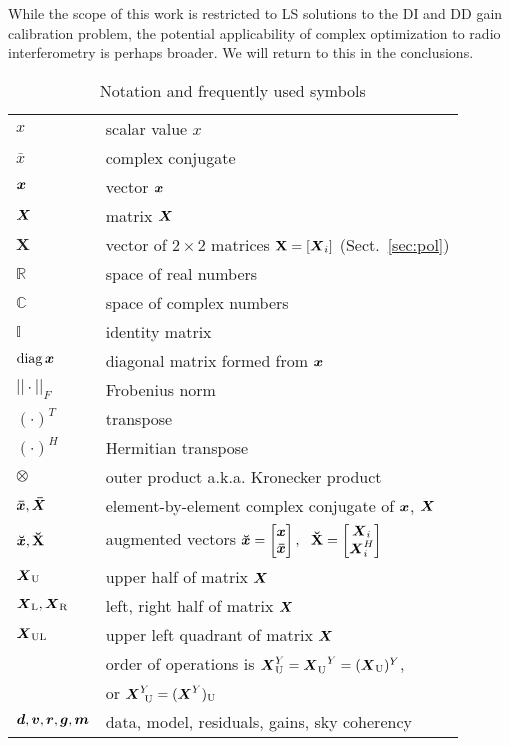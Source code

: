 \documentclass[useAMS,usenatbib]{mn2e}
\makeatletter
\newcommand{\COMPLEX}{\mathbb{C}}
\newcommand{\REAL}{\mathbb{R}}
\newcommand{\II}{\mathbb{I}}
\newcommand{\Matrix}[2]{\left [ \begin{array}{@{}#1@{}}#2\end{array} \right ]}
\newcommand{\AUGx}[1]{\mathbf{\breve{#1}}}
\newcommand{\AUG}[1]{\bmath{\breve{#1}}}
\newcommand{\TOP}{\mathrm{U}}%
\newcommand{\LEFT}{\mathrm{L}}
\newcommand{\RIGHT}{\mathrm{R}}
\newcommand{\UL}{\mathrm{UL}}%
\numberwithin{equation}{section}
\makeatother
\begin{document}
While the scope of this work is restricted to LS solutions to the DI and DD gain calibration problem, the potential 
applicability of complex optimization to radio interferometry is perhaps broader. We will return to this in the conclusions.


\begin{table}
\caption{\label{tab:notation}Notation and frequently used symbols}
\begin{tabular}{ll}
\hline
$x$        & scalar value $x$    \\
$\bar{x}$        & complex conjugate    \\
$\bmath{x}$  & vector $\bmath{x}$  \\
$\bmath{X}$  & matrix $\bmath{X}$ \\
$\mathbf{X}$  & vector of $2\times2$ matrices $\mathbf{X}=[\bmath{X}_i]$ (Sect.~\ref{sec:pol})  \\
$\REAL$ & space of real numbers \\
$\COMPLEX$ & space of complex numbers \\
$\II$ & identity matrix \\
$\mathrm{diag}\,\bmath{x}$ & diagonal matrix formed from $\bmath{x}$\\
$||\cdot||_F$ & Frobenius norm \\
$(\cdot)^T$ & transpose \\
$(\cdot)^H$ & Hermitian transpose \\
$\otimes$ & outer product a.k.a. Kronecker product\\
$\bmath{\bar x},\bmath{\bar X}$ & element-by-element complex conjugate of $\bmath{x}$, $\bmath{X}$  \\
$\AUG{x}, \AUGx{X}$ & augmented vectors $\AUG{x} = \Matrix{c}{\bmath{x} \\ \bmath{\bar x}},~~\AUGx{X}=\Matrix{c}{\bmath{X}_i \\ \bmath{X}^H_i}$ \\
$\bmath{X}_\TOP$ & upper half of matrix $\bmath{X}$\\
$\bmath{X}_\LEFT, \bmath{X}_\RIGHT$ & left, right half of matrix $\bmath{X}$ \\
$\bmath{X}_\UL$ & upper left quadrant of matrix $\bmath{X}$\\
& order of operations is $\bmath{X}^Y_\TOP = \bmath{X}^{~~Y}_\TOP = (\bmath{X}_\TOP)^Y$, \\
& or $\bmath{X}^Y_{~\TOP} = (\bmath{X}^Y)_\TOP$ \\
$\bmath{d},\bmath{v},\bmath{r}, \bmath{g}, \bmath{m} $ & data, model, residuals, gains, sky coherency\\

\end{tabular}
\end{table}
\end{document}
